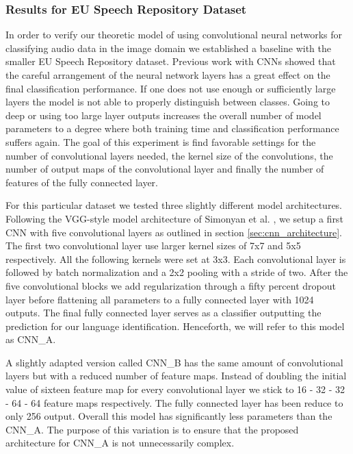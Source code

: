 \subsubsection{Results for EU Speech Repository Dataset}
\label{sec:results_eu}
In order to verify our theoretic model of using convolutional neural networks for classifying audio data in the image domain we established a baseline with the smaller EU Speech Repository dataset. Previous work with CNNs showed that the careful arrangement of the neural network layers has a great effect on the final classification performance. If one does not use enough or sufficiently large layers the model is not able to properly distinguish between classes. Going to deep or using too large layer outputs increases the overall number of model parameters to a degree where both training time and classification performance suffers again. The goal of this experiment is find favorable settings for the number of convolutional layers needed, the kernel size of the convolutions, the number of output maps of the convolutional layer and finally the number of features of the fully connected layer.

For this particular dataset we tested three slightly different model architectures. Following the VGG-style model architecture of Simonyan et al. \cite{Chatfield14}, we setup a first CNN with five convolutional layers as outlined in section \ref{sec:cnn_architecture}. The first two convolutional layer use larger kernel sizes of 7x7 and 5x5 respectively. All the following kernels were set at 3x3. Each convolutional layer is followed by batch normalization and a 2x2 pooling with a stride of two. After the five convolutional blocks we add regularization through a fifty percent dropout layer before flattening all parameters to a fully connected layer with 1024 outputs. The final fully connected layer serves as a classifier outputting the prediction for our language identification. Henceforth, we will refer to this model as CNN\_A.

A slightly adapted version called CNN\_B has the same amount of convolutional layers but with a reduced number of feature maps. Instead of doubling the initial value of sixteen feature map for every convolutional layer we stick to 16 - 32 - 32 - 64 - 64 feature maps respectively. The fully connected layer has been reduce to only 256 output. Overall this model has significantly less parameters than the CNN\_A. The purpose of this variation is to ensure that the proposed architecture for CNN\_A is not unnecessarily complex.
	
